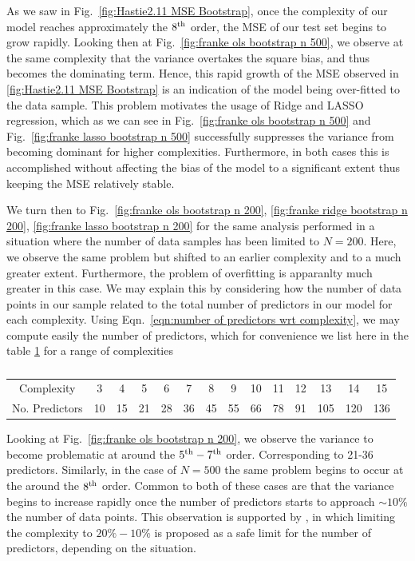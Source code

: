 \documentclass[reprint, english, nofootinbib]{revtex4-2}
\begin{document}
As we saw in Fig.~\ref{fig:Hastie2.11 MSE Bootstrap}, once the complexity of our model reaches approximately the $8^{\textup{th}}$ order, the MSE of our test set begins to grow rapidly. Looking then at Fig.~\ref{fig:franke ols bootstrap n 500}, we observe at the same complexity that the variance overtakes the square bias, and thus becomes the dominating term. Hence, this rapid growth of the MSE observed in \ref{fig:Hastie2.11 MSE Bootstrap} is an indication of the model being over-fitted to the data sample.
This problem motivates the usage of Ridge and LASSO regression, which as we can see in Fig.~\ref{fig:franke ols bootstrap n 500} and Fig.~\ref{fig:franke lasso bootstrap n 500} successfully suppresses the variance from becoming dominant for higher complexities. Furthermore, in both cases this is accomplished without affecting the bias of the model to a significant extent thus keeping the MSE relatively stable.

We turn then to Fig.~\ref{fig:franke ols bootstrap n 200}, \ref{fig:franke ridge bootstrap n 200}, \ref{fig:franke lasso bootstrap n 200} for the same analysis performed in a situation where the number of data samples has been limited to $N=200$. Here, we observe the same problem but shifted to an earlier complexity and to a much greater extent. Furthermore, the problem of overfitting is apparanlty much greater in this case. We may explain this by considering how the number of data points in our sample related to the total number of predictors in our model for each complexity. Using Eqn.~\ref{eqn:number of predictors wrt complexity}, we may compute easily the number of predictors, which for convenience we list here in the table \ref{tab: no predictors wrt complexity} for a range of complexities

\begin{table}[h!]
    \caption{\label{tab: no predictors wrt complexity}}
    \begin{tabular}{|c | c | c | c | c | c | c | c | c | c | c | c | c | c |}
    \hline
     Complexity     & 3  & 4  & 5  & 6  & 7  & 8  & 9  & 10 & 11 & 12 & 13 & 14 & 15 \\
     No. Predictors & 10 & 15 & 21 & 28 & 36 & 45 & 55 & 66 & 78 & 91 & 105 & 120 & 136
     \\ \hline
    \end{tabular}
\end{table}

Looking at Fig.~\ref{fig:franke ols bootstrap n 200}, we observe the variance to become problematic at around the $5^{\textup{th}}-7^{\textup{th}}$ order. Corresponding to 21-36 predictors. Similarly, in the case of $N=500$ the same problem begins to occur at the around the $8^{\textup{th}}$ order. Common to both of these cases are that the variance begins to increase rapidly once the number of predictors starts to approach $\sim 10\%$ the number of data points. This observation is supported by \textcite{Harell}, in which limiting the complexity to $20\%-10\%$ is proposed as a safe limit for the number of predictors, depending on the situation.
\end{document}
